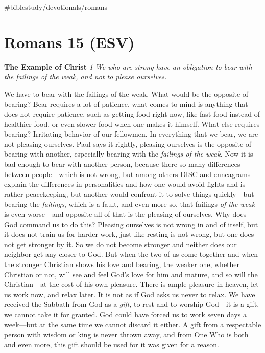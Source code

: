 \#biblestudy/devotionals/romans

\hypertarget{romans-15-esv}{%
\section{Romans 15 (ESV)}\label{romans-15-esv}}

\textbf{The Example of Christ} \emph{1 We who are strong have an
obligation to bear with the failings of the weak, and not to please
ourselves.}

We have to bear with the failings of the weak. What would be the
opposite of bearing? Bear requires a lot of patience, what comes to mind
is anything that does not require patience, such as getting food right
now, like fast food instead of healthier food, or even slower food when
one makes it himself. What else requires bearing? Irritating behavior of
our fellowmen. In everything that we bear, we are not pleasing
ourselves. Paul says it rightly, pleasing ourselves is the opposite of
bearing with another, especially bearing with the \emph{failings of the
weak}. Now it is bad enough to bear with another person, because there
so many differences between people---which is not wrong, but among
others DISC and enneagrams explain the differences in personalities and
how one would avoid fights and is rather peacekeeping, but another would
confront it to solve things quickly---but bearing the \emph{failings},
which is a fault, and even more so, that failings \emph{of the weak} is
even worse---and opposite all of that is the pleasing of ourselves. Why
does God command us to do this? Pleasing ourselves is not wrong in and
of itself, but it does not train us for harder work, just like resting
is not wrong, but one does not get stronger by it. So we do not become
stronger and neither does our neighbor get any closer to God. But when
the two of us come together and when the stronger Christian shows his
love and bearing, the weaker one, whether Christian or not, will see and
feel God's love for him and mature, and so will the Christian---at the
cost of his own pleasure. There is ample pleasure in heaven, let us work
now, and relax later. It is not as if God asks us never to relax. We
have received the Sabbath from God as a \emph{gift}, to rest and to
worship God---it is a gift, we cannot take it for granted. God could
have forced us to work seven days a week---but at the same time we
cannot discard it either. A gift from a respectable person with wisdom
or king is never thrown away, and from One Who is both and even more,
this gift should be used for it was given for a reason.

